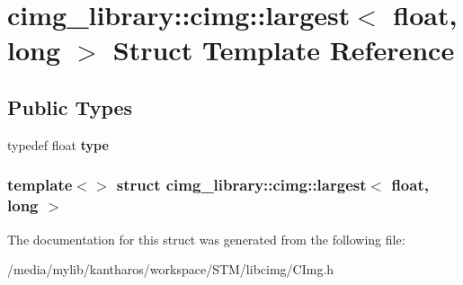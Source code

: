 \hypertarget{structcimg__library_1_1cimg_1_1largest_3_01float_00_01long_01_4}{
\section{cimg\_\-library::cimg::largest$<$ float, long $>$ Struct Template Reference}
\label{structcimg__library_1_1cimg_1_1largest_3_01float_00_01long_01_4}
}
\subsection*{Public Types}
\begin{DoxyCompactItemize}
\item 
\hypertarget{structcimg__library_1_1cimg_1_1largest_3_01float_00_01long_01_4_a63160fd4c609ec18ce431ec91aa6a70b}{
typedef float {\bfseries type}}
\label{structcimg__library_1_1cimg_1_1largest_3_01float_00_01long_01_4_a63160fd4c609ec18ce431ec91aa6a70b}

\end{DoxyCompactItemize}
\subsubsection*{template$<$$>$ struct cimg\_\-library::cimg::largest$<$ float, long $>$}



The documentation for this struct was generated from the following file:\begin{DoxyCompactItemize}
\item 
/media/mylib/kantharos/workspace/STM/libcimg/CImg.h\end{DoxyCompactItemize}
